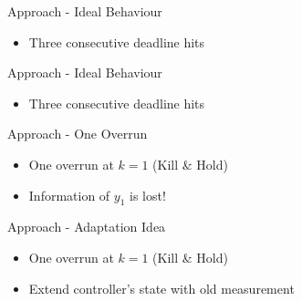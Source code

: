 \begin{frame}{Approach - Ideal Behaviour}
    \begin{itemize}
        \item Three consecutive deadline hits
    \end{itemize}

    \begin{figure}[h]
        \centerline{}
    \end{figure}
\end{frame}

\begin{frame}{Approach - Ideal Behaviour}
    \begin{itemize}
        \item Three consecutive deadline hits
    \end{itemize}

    \begin{figure}[h]
        \centerline{}
    \end{figure}
\end{frame}

\begin{frame}{Approach - One Overrun}
    \begin{itemize}
        \item One overrun at $k=1$ (Kill \& Hold)
        \item Information of $y_1$ is lost!
    \end{itemize}

    \begin{figure}[h]
        \centerline{}
    \end{figure}
\end{frame}

\begin{frame}{Approach - Adaptation Idea}
    \begin{itemize}
        \item One overrun at $k=1$ (Kill \& Hold)
        \item Extend controller's state with old measurement
    \end{itemize}

    \begin{figure}[h]
        \centerline{}
    \end{figure}
\end{frame}

